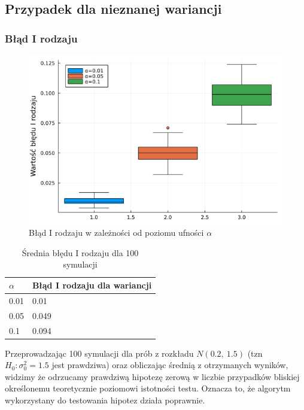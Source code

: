 \documentclass{article}
\theoremstyle{break}
\begin{document}
\subsection*{Przypadek dla nieznanej wariancji}
\subsubsection*{Błąd I rodzaju}
\begin{figure}[H]
	\begin{center}
		\includegraphics[scale=0.5]{Z3.Irodzaj.png}
		\caption{Błąd I rodzaju w zależności od poziomu ufności $\alpha$}
	\end{center}
\end{figure}

\begin{table}[H]
	\begin{center}
		\begin{tabular}{|l|l|}
			\hline
			\rowcolor[HTML]{EFEFEF} 
			$\alpha$ & Błąd I rodzaju dla wariancji \\ \hline
			0.01 & 0.01                         \\ \hline
			0.05 & 0.049                         \\ \hline
			0.1  & 0.094                         \\ \hline
		\end{tabular}
		\caption{Średnia błędu I rodzaju dla 100 symulacji}
	\end{center}
\end{table}
Przeprowadzając 100 symulacji dla prób z rozkładu $N(0.2,~1.5)$ (tzn $H_0: \sigma^2_0 = 1.5$ jest prawdziwa) oraz obliczając średnią z otrzymanych wyników, widzimy że odrzucamy prawdziwą hipotezę zerową w liczbie przypadków bliskiej określonemu teoretycznie poziomowi istotności testu. Oznacza to, że algorytm wykorzystany do testowania hipotez działa poprawnie.
\end{document}
